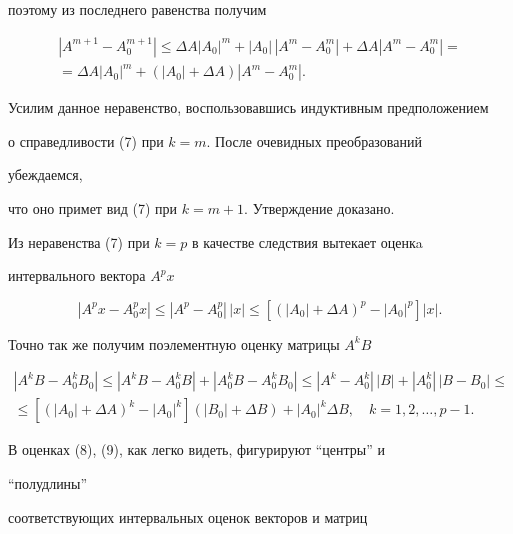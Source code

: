 поэтому из последнего равенства получим 


\begin{multline*} 


|A^{m+1}-A^{m+1}_0|\le\Delta A|A_0|^m+|A_0|\,|A^m-A^m_0|+ 


\Delta A|A^m-A^m_0|=\\ 


=\Delta A|A_0|^m+(|A_0|+\Delta A)|A^m-A^m_0|. 


\end{multline*} 


Усилим данное неравенство, воспользовавшись индуктивным предположением 


о справедливости (7) при $k=m$. После очевидных преобразований 


убеждаемся, 


что оно примет вид (7) при $k=m+1$. Утверждение доказано. 


 


Из неравенства (7) при $k=p$ в качестве следствия вытекает оценкa 


интервального вектора $A^p x$ 


\begin{equation} 


|A^p x-A^p_0x|\le|A^p-A^p_0|\,|x|\le 


[(|A_0|+\Delta A)^p-|A_0|^p]|x|. 


\end{equation} 


Точно так же получим поэлементную оценку матрицы $A^k B$ 


\begin{multline} 


|A^k B-A^k_0B_0|\le|A^k B-A^k_0B|+|A^k_0B-A^k_0B_0|\le 


|A^k-A^k_0|\,|B|+|A^k_0|\,|B-B_0|\le \\ 


\le[(|A_0|+\Delta A)^k-|A_0|^k](|B_0|+\Delta B)+ 


|A_0|^k\Delta B,\quad k=1,2,\dotsc,p-1. 


\end{multline} 


В оценках (8), (9), как легко видеть, фигурируют ``центры'' и 


``полудлины'' 


соответствующих интервальных оценок векторов и матриц


